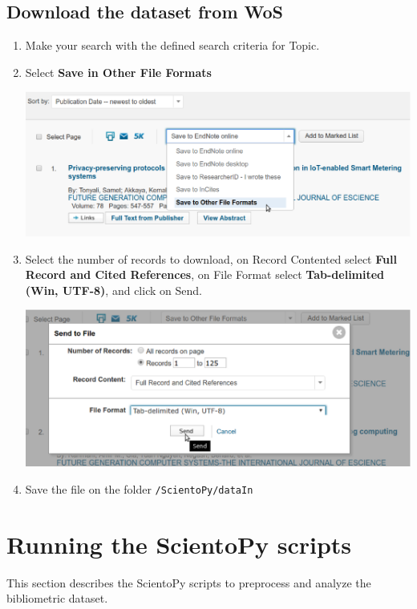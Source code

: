 \documentclass[10pt,letterpaper]{article}
\begin{document}
\subsection{Download the dataset from WoS}
\begin{enumerate}
\item Make your search with the defined search criteria for Topic. 
\item Select \textbf{Save in Other File Formats}
	\begin{center}
		\includegraphics[scale=0.33]{./figures/wos1.eps}
	\end{center}

\item Select the number of records to download, on Record Contented select \textbf{Full Record and Cited References}, on File Format select \textbf{Tab-delimited (Win, UTF-8)}, and click on Send.
	\begin{center}
		\includegraphics[scale=0.33]{./figures/wos2.eps}
	\end{center}

\item Save the file on the folder \verb|/ScientoPy/dataIn|
\end{enumerate}

\section{Running the ScientoPy scripts}

This section describes the ScientoPy scripts to preprocess and analyze the bibliometric dataset. 
\end{document}
